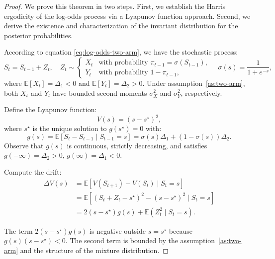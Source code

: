 \documentclass[12pt]{article}
\begin{document}
\begin{proof}
    We prove this theorem in two steps. First, we establish the Harris ergodicity of the log-odds process via a Lyapunov function approach. Second, we derive the existence and characterization of the invariant distribution for the posterior probabilities.
    
    According to equation \eqref{eq:log-odds-two-arm}, we have the stochastic process:
    \[
    S_{t} = S_{t-1} + Z_t, \quad Z_t \sim
    \begin{cases}
    X_t & \text{with probability } \pi_{t-1} = \sigma(S_{t-1}), \\
    Y_t & \text{with probability } 1 - \pi_{t-1},
    \end{cases} \quad \sigma(s) = \frac{1}{1 + e^{-s}},
    \]
    where $\mathbb{E}[X_t] = \Delta_1 < 0$ and $\mathbb{E}[Y_t] = \Delta_2 > 0$. Under assumption~\ref{as:two-arm}, both $X_t$ and $Y_t$ have bounded second moments $\sigma_X^2$ and $\sigma_Y^2$, respectively.
    
    Define the Lyapunov function:
    \[
    V(s) = (s - s^\star)^2,
    \]
    where $s^\star$ is the unique solution to $g(s^\star)=0$ with:
    \[
    g(s) = \mathbb{E}[S_t - S_{t-1} \mid S_{t-1}=s] = \sigma(s) \Delta_1 + (1 - \sigma(s)) \Delta_2.
    \]
    Observe that $g(s)$ is continuous, strictly decreasing, and satisfies $g(-\infty)=\Delta_2>0$, $g(\infty)=\Delta_1<0$.
    
    Compute the drift:
    \[
    \begin{aligned}
    \Delta V(s) &= \mathbb{E}[V(S_{t+1}) - V(S_t) \mid S_t=s] \\
    &= \mathbb{E}[(S_t + Z_t - s^\star)^2 - (s - s^\star)^2 \mid S_t=s] \\
    &= 2(s - s^\star)g(s) + \mathbb{E}(Z^2_t \mid S_t=s).
    \end{aligned}
    \]
    
    The term $2(s-s^\star)g(s)$ is negative outside $s=s^\star$ because $g(s)(s-s^\star)<0$. The second term is bounded by the assumption~\ref{as:two-arm} and the structure of the mixture distribution.
    

\end{proof}
\end{document}
